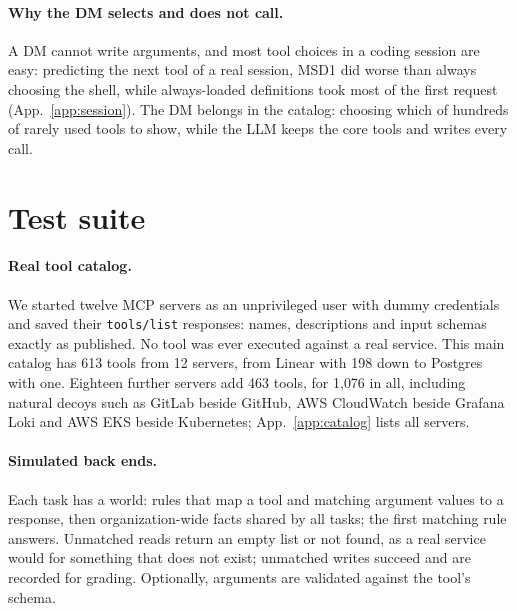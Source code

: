 \documentclass[11pt]{article}
\newcommand{\msd}{MSD1}
\begin{document}
\paragraph{Why the DM selects and does not call.} A DM cannot write arguments, and most tool choices in a coding
session are easy: predicting the next tool of a real session, \msd{} did worse than always choosing the shell,
while always-loaded definitions took most of the first request (App.~\ref{app:session}). The DM belongs in the
catalog: choosing which of hundreds of rarely used tools to show, while the LLM keeps the core tools and writes
every call.

\section{Test suite}\label{sec:suite}
\paragraph{Real tool catalog.} We started twelve MCP servers as an unprivileged user with dummy credentials and
saved their \texttt{tools/list} responses: names, descriptions and input schemas exactly as published. No tool
was ever executed against a real service. This main catalog has 613 tools from 12 servers, from Linear with 198
down to Postgres with one. Eighteen further servers add 463 tools, for 1{,}076 in all, including natural decoys
such as GitLab beside GitHub, AWS CloudWatch beside Grafana Loki and AWS EKS beside Kubernetes;
App.~\ref{app:catalog} lists all servers.

\paragraph{Simulated back ends.} Each task has a world: rules that map a tool and matching argument values to a
response, then organization-wide facts shared by all tasks; the first matching rule answers. Unmatched reads
return an empty list or not found, as a real service would for something that does not exist; unmatched writes
succeed and are recorded for grading. Optionally, arguments are validated against the tool's schema.
\end{document}
